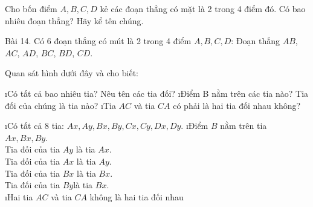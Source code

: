 \begin{bt}
	Cho bốn điểm $A,B,C,D$ kẻ các đoạn thẳng có mặt là 2 trong 4 điểm đó. Có bao nhiêu đoạn thẳng? Hãy kể tên chúng.
	\begin{loigiaichuong28}
		Bài 14. Có 6 đoạn thẳng có mút là 2 trong 4 điểm $A,B,C,D$:
		Đoạn thẳng $AB$, $AC$, $AD$, $BC$, $BD$, $CD$.
	\end{loigiaichuong28}
\end{bt}
\begin{bt}
	Quan sát hình dưới đây và cho biết:
	\begin{enumerate}[a),leftmargin=*]
		\i Có tất cả bao nhiêu tia? Nêu tên các tia đối?
		\i Điểm B nằm trên các tia nào? Tia đối của chúng là tia nào?
		\i Tia $AC$ và tia $CA$ có phải là hai tia đối nhau không?
	\end{enumerate}
	\begin{loigiaichuong28}
		\begin{enumerate}[a),leftmargin=*]
			\i Có tất cả 8 tia: $Ax,Ay,Bx,By,Cx,Cy,Dx,Dy$.
			\i Điểm $B$ nằm trên tia $Ax,Bx,By$.\\
			Tia đối của tia $Ay$ là tia $Ax$.\\
			Tia đối của tia $Ax$ là tia $Ay$.\\
			Tia đối của tia $Bx$ là tia $Bx$.\\
			Tia đối của tia $By$là tia $Bx$.\\
			\i Hai tia $AC$ và tia $CA$ không là hai tia đối nhau
		\end{enumerate}
	\end{loigiaichuong28}
\end{bt}
